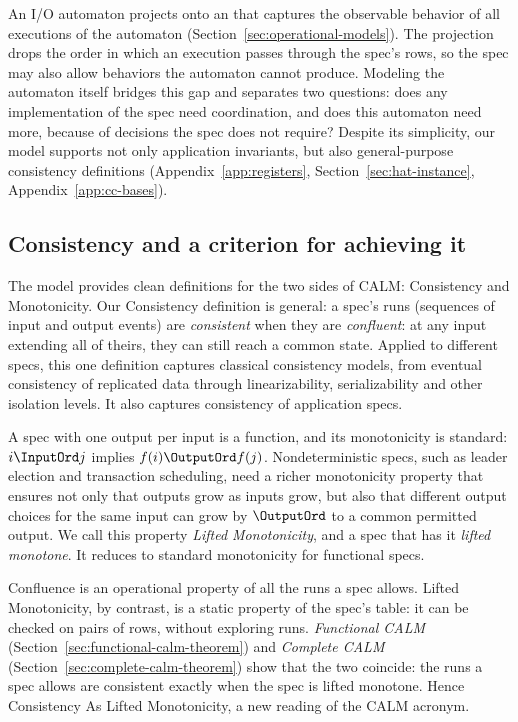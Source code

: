 An I/O automaton projects onto an \spectype[] that captures the observable
behavior of all executions of the automaton
(Section~\ref{sec:operational-models}).  The projection drops the order in
which an execution passes through the spec's rows, so the spec may also allow
behaviors the automaton cannot produce.  Modeling the automaton itself bridges
this gap and separates two questions: does any implementation of the spec need
coordination, and does this automaton need more, because of decisions the spec
does not require?
Despite its simplicity, our model supports not only application invariants,
but also general-purpose consistency definitions (Appendix~\ref{app:registers},
Section~\ref{sec:hat-instance}, Appendix~\ref{app:cc-bases}).

\subsection{Consistency and a criterion for achieving it}
The model provides clean definitions for the two sides of CALM: Consistency
and Monotonicity.  Our Consistency definition is general: a spec's runs
(sequences of input and output events) are \emph{consistent} when they are
\emph{confluent}: at any input extending all of theirs, they can still reach a
common state.  Applied to different specs,
this one definition captures classical consistency models, from eventual
consistency of replicated data through linearizability, serializability and
other isolation levels.  It also captures consistency of
application specs.

A spec with one output per input is a function, and its monotonicity is standard: $i\InputOrd j$
implies $f(i)\OutputOrd f(j)$.  Nondeterministic specs, such as leader election
and transaction scheduling, need a richer monotonicity property that ensures
not only that outputs grow as inputs grow, but also that different output
choices for the same input can grow by $\OutputOrd$ to a common permitted
output.  We call this property \emph{Lifted Monotonicity}, and a spec that has
it \emph{lifted monotone}.  It reduces to standard monotonicity for functional specs.

Confluence is an operational property of all the runs a spec allows.  Lifted Monotonicity,
by contrast, is a static property of the spec's table: it can be checked on
pairs of rows, without exploring runs.  \emph{Functional CALM}
(Section~\ref{sec:functional-calm-theorem}) and \emph{Complete CALM}
(Section~\ref{sec:complete-calm-theorem}) show that the two coincide: the runs a spec allows are consistent exactly when the spec is
lifted monotone.  Hence Consistency As Lifted Monotonicity, a new reading of the
CALM acronym.

